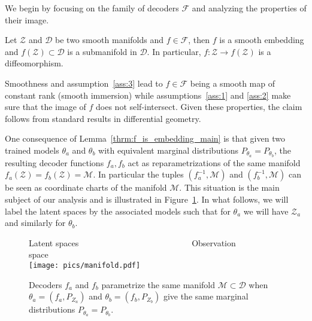 We begin by focusing on the family of decoders $\mathcal{F}$ and analyzing the properties of their image.
%
\begin{lemma}\label{thrm:f_is_embedding_main}
   Let $\mathcal{Z}$ and $\mathcal{D}$ be two smooth manifolds and $f \in \mathcal{F}$, then $f$ is a smooth embedding and $f(\mathcal{Z})\subset \mathcal{D}$ is a submanifold in $\mathcal{D}$. In particular, $f:\mathcal{Z}\rightarrow f(\mathcal{Z})$ is a diffeomorphism.
\end{lemma}
%
\begin{proofsketch}
Smoothness and assumption~\ref{ass:3} lead to $f\in \mathcal{F}$ being a smooth map of constant rank (smooth immersion) while assumptions~\ref{ass:1} and \ref{ass:2} make sure that the image of $f$ does not self-intersect. Given these properties, the claim follows from standard results in differential geometry.
\end{proofsketch}
%
One consequence of Lemma~\ref{thrm:f_is_embedding_main} is that given two trained models $\theta_a$ and $\theta_b$ with equivalent marginal distributions  $P_{\theta_a} = P_{\theta_b}$, the resulting decoder functions $f_a,f_b$ act as reparametrizations of the same manifold $f_a(\mathcal{Z}) =f_b(\mathcal{Z})=\mathcal{M}$. In particular the tuples $(f_a^{-1},\mathcal{M})$ and $(f_b^{-1},\mathcal{M})$ can be seen as coordinate charts of the manifold $\mathcal{M}$. This situation is the main subject of our analysis and is illustrated in Figure~\ref{fig:drawing}. In what follows, we will label the latent spaces by the associated models such that for $\theta_a$ we will have $\mathcal{Z}_a$ and similarly for $\theta_b$. 

\begin{figure}
    \centering
    \footnotesize{Latent spaces~~~~~~~~~~~~~~~~~~~~~~~~~~~Observation space~~~~~~~~~}\\
    \texttt{[image: pics/manifold.pdf]} \\ \vspace{1mm}
    \vspace{-2mm}
    \caption{Decoders $f_a$ and $f_b$ parametrize the same manifold $\mathcal{M} \subset \mathcal{D}$ when $\theta_a=\left(f_a, P_{Z_a}\right)$ and $\theta_b=\left(f_b, P_{Z_b}\right)$ give the same marginal distributions $P_{\theta_a}=P_{\theta_b}$.}
    \label{fig:drawing}
\end{figure}

